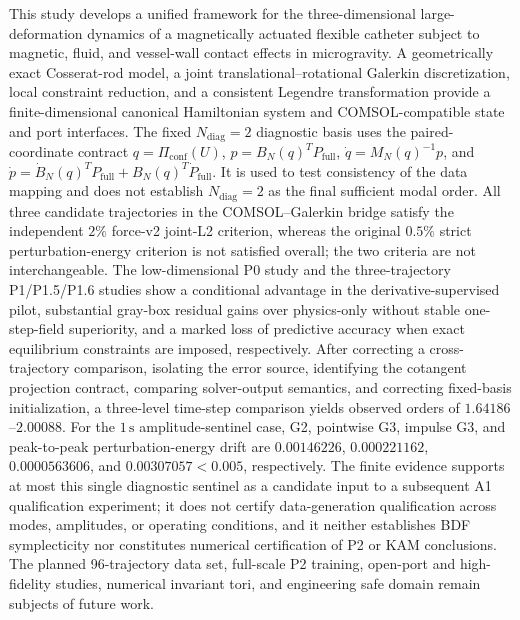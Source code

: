 This study develops a unified framework for the three-dimensional large-deformation dynamics of a magnetically actuated flexible catheter subject to magnetic, fluid, and vessel-wall contact effects in microgravity. A geometrically exact Cosserat-rod model, a joint translational--rotational Galerkin discretization, local constraint reduction, and a consistent Legendre transformation provide a finite-dimensional canonical Hamiltonian system and COMSOL-compatible state and port interfaces. The fixed \(N_{\mathrm{diag}}=2\) diagnostic basis uses the paired-coordinate contract \(q=\Pi_{\mathrm{conf}}(U)\), \(p=B_N(q)^TP_{\mathrm{full}}\), \(\dot q=M_N(q)^{-1}p\), and \(\dot p=\dot B_N(q)^TP_{\mathrm{full}}+B_N(q)^T\dot P_{\mathrm{full}}\). It is used to test consistency of the data mapping and does not establish \(N_{\mathrm{diag}}=2\) as the final sufficient modal order. All three candidate trajectories in the COMSOL--Galerkin bridge satisfy the independent \(2\%\) force-v2 joint-L2 criterion, whereas the original \(0.5\%\) strict perturbation-energy criterion is not satisfied overall; the two criteria are not interchangeable. The low-dimensional P0 study and the three-trajectory P1/P1.5/P1.6 studies show a conditional advantage in the derivative-supervised pilot, substantial gray-box residual gains over physics-only without stable one-step-field superiority, and a marked loss of predictive accuracy when exact equilibrium constraints are imposed, respectively. After correcting a cross-trajectory comparison, isolating the error source, identifying the cotangent projection contract, comparing solver-output semantics, and correcting fixed-basis initialization, a three-level time-step comparison yields observed orders of \(1.64186\)--\(2.00088\). For the \(1\,\mathrm{s}\) amplitude-sentinel case, G2, pointwise G3, impulse G3, and peak-to-peak perturbation-energy drift are \(0.00146226\), \(0.000221162\), \(0.0000563606\), and \(0.00307057<0.005\), respectively. The finite evidence supports at most this single diagnostic sentinel as a candidate input to a subsequent A1 qualification experiment; it does not certify data-generation qualification across modes, amplitudes, or operating conditions, and it neither establishes BDF symplecticity nor constitutes numerical certification of P2 or KAM conclusions. The planned 96-trajectory data set, full-scale P2 training, open-port and high-fidelity studies, numerical invariant tori, and engineering safe domain remain subjects of future work.
